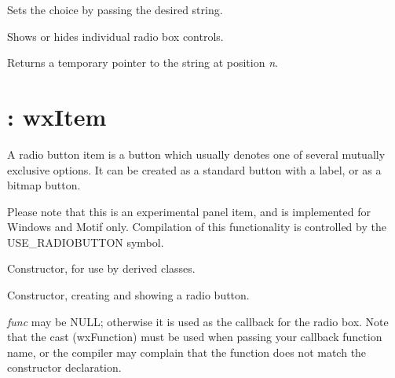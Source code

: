 Sets the choice by passing the desired string.



Shows or hides individual radio box controls.



Returns a temporary pointer to the string at position {\it n}.


\section{: wxItem}\label{wxradiobutton}

A radio button item is a button which usually denotes one of several mutually
exclusive options. It can be created as a standard button with a label, or as a bitmap button.

Please note that this is an experimental panel item, and is implemented for Windows
and Motif only. Compilation of this functionality is controlled by the USE\_RADIOBUTTON symbol.

\label{constrradiobutton}


Constructor, for use by derived classes.



Constructor, creating and showing a radio button.

{\it func} may be NULL; otherwise it is used as the callback for the
radio box.  Note that the cast (wxFunction) must be used when passing your
callback function name, or the compiler may complain that the function
does not match the constructor declaration.

